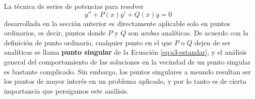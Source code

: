  
\makeatletter
\ifdefined\bbereffixdone\else
  \def\bbereffixdone{}
\fi
\makeatother
 
\providecommand{\bbezero}[2]{\addplot[bbegray!70, thin, forget plot] coordinates {(#1,0) (#2,0)};}
 
 
La técnica de series de potencias para resolver
\begin{equation}
y'' + P(x)y' + Q(x)y = 0
\label{eq:s3-estandar}
\end{equation}
desarrollada en la sección anterior es directamente aplicable solo en puntos ordinarios, es decir, puntos donde $P$ y $Q$ son \textit{ambas} analíticas. De acuerdo con la definición de punto ordinario, cualquier punto en el que $P$ o $Q$ dejen de ser analíticas se llama \textbf{punto singular} de la Ecuación \eqref{eq:s3-estandar}, y el análisis general del comportamiento de las soluciones en la vecindad de un punto singular es bastante complicado. Sin embargo, los puntos singulares a menudo resultan ser los puntos de mayor interés en un problema aplicado, y por lo tanto es de cierta importancia que persigamos este análisis.
 
